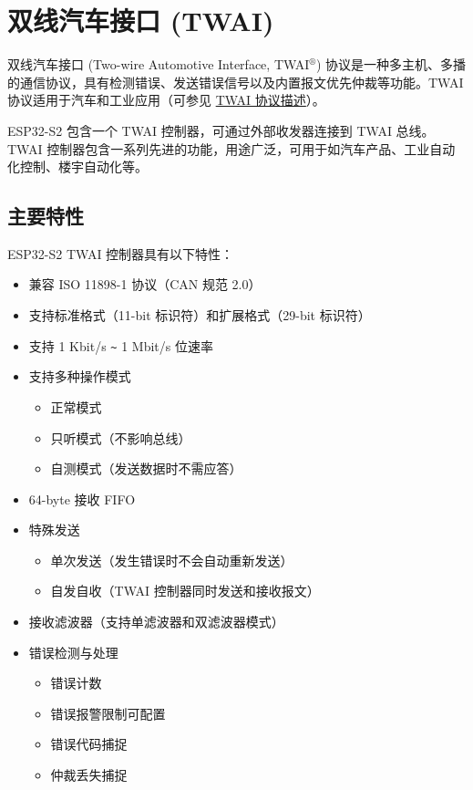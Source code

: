 \documentclass[main\_\_CN.tex]{subfiles}
\begin{document}

\ifglobal
\else
    {\let\clearpage\relax \listoftodos}
    \tableofcontents
\fi




\hypertarget{twai}{}
\chapter{双线汽车接口 (TWAI)}
\label{mod:twai}

双线汽车接口 (Two-wire Automotive Interface, TWAI$^\circledR$) 协议是一种多主机、多播的通信协议，具有检测错误、发送错误信号以及内置报文优先仲裁等功能。TWAI 协议适用于汽车和工业应用（可参见 \hyperref[subsec:protocol-description]{TWAI 协议描述}）。

ESP32-S2 包含一个 TWAI 控制器，可通过外部收发器连接到 TWAI 总线。TWAI 控制器包含一系列先进的功能，用途广泛，可用于如汽车产品、工业自动化控制、楼宇自动化等。

\section{主要特性}
ESP32-S2 TWAI 控制器具有以下特性：
\begin{itemize}
    \item 兼容 ISO 11898-1 协议（CAN 规范 2.0）
    \item 支持标准格式（11-bit 标识符）和扩展格式（29-bit 标识符）
    \item 支持 1 Kbit/s \verb+~+ 1 Mbit/s 位速率
    \item 支持多种操作模式
    \begin{itemize}
        \item 正常模式
        \item 只听模式（不影响总线）
        \item 自测模式（发送数据时不需应答）
    \end{itemize}
    \item 64-byte 接收 FIFO
    \item 特殊发送
    \begin{itemize}
        \item 单次发送（发生错误时不会自动重新发送）
        \item 自发自收（TWAI 控制器同时发送和接收报文）
    \end{itemize}
    \item 接收滤波器（支持单滤波器和双滤波器模式）
    \item 错误检测与处理
    \begin{itemize}
        \item 错误计数
        \item 错误报警限制可配置
        \item 错误代码捕捉
        \item 仲裁丢失捕捉
    \end{itemize}
\end{itemize}
\end{document}
